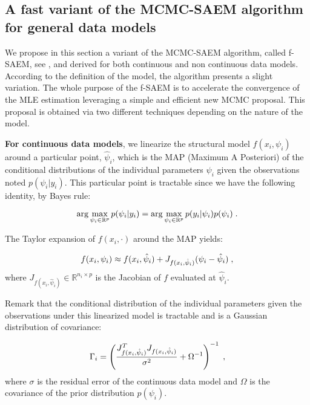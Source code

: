 \subsection{A fast variant of the MCMC-SAEM algorithm for general data models}

We propose in this section a variant of the MCMC-SAEM algorithm, called f-SAEM, see \cite{Karimi19}, and derived for both continuous and non continuous data models.
According to the definition of the model, the algorithm presents a slight variation.
The whole purpose of the f-SAEM is to accelerate the convergence of the MLE estimation leveraging a simple and efficient new MCMC proposal.
This proposal is obtained via two different techniques depending on the nature of the model.

\textbf{For continuous data models}, we linearize the structural model $f(x_{i}, \psi_i)$ around a particular point, $\hat{\psi}_i$, which is the MAP (Maximum A Posteriori) of the conditional distributions of the individual parameters $\psi_i$ given the observations noted $p(\psi_i|y_i) $. This particular point is tractable since we have the following identity, by Bayes rule:

\begin{equation}
\arg \max \limits_{\psi_i \in \mathbb{R}^p} p(\psi_i|y_i) = \arg \max \limits_{\psi_i \in \mathbb{R}^p} p(y_i|\psi_i)p(\psi_i) \;.
\end{equation}

The Taylor expansion of $f(x_{i},\cdot)$ around the MAP yields:

\begin{equation}
f(x_{i},\psi_i) \approx f(x_{i},\hat{\psi}_i) + J_{f(x_{i},\hat{\psi}_i)}(\psi_i - \hat{\psi}_i)\;,
\end{equation}
where $J_{f(x_{i},\hat{\psi}_i)} \in \mathbb{R}^{n_i \times p}$ is the Jacobian of $f$ evaluated at $\hat{\psi}_i$. 

Remark that the conditional distribution of the individual parameters given the observations under this linearized model is tractable and is a Gaussian distribution of covariance:


\begin{equation}
\Gamma_i =\left(\frac{ J_{f(x_{i},\hat{\psi}_i)}^T J_{f(x_{i},\hat{\psi}_i)} }{\sigma^2} + \Omega^{-1}\right)^{-1} \;,
\end{equation}
where $\sigma$ is the residual error of the continuous data model and $\Omega$ is the covariance of the prior distribution $p(\psi_i)$.

